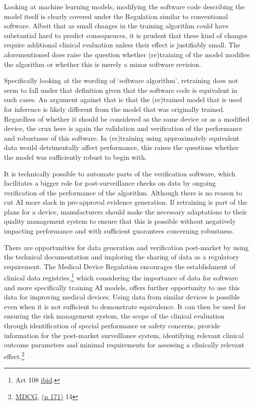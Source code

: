 \documentclass[
]{scrartcl}
\begin{document}
Looking at machine learning models, modifying the software code describing the model itself is clearly covered under the Regulation similar to conventional software. Albeit that as small changes in the training algorithm could have substantial hard to predict consequences, it is prudent that these kind of changes require additional clinical evaluation unless their effect is justifiably small. The aforementioned does raise the question whether (re)training of the model modifies the algorithm or whether this is merely a minor software revision.

Specifically looking at the wording of `software algorithm', retraining does not seem to fall under that definition given that the software code is equivalent in such cases. An argument against that is that the (re)trained model that is used for inference is likely different from the model that was originally trained. Regardless of whether it should be considered as the same device or as a modified device, the crux here is again the validation and verification of the performance and robustness of this software. In (re)training using approximately equivalent data would detrimentally affect performance, this raises the questions whether the model was sufficiently robust to begin with.

It is technically possible to automate parts of the verification software, which facilitates a bigger role for post-surveillance checks on data by ongoing verification of the performance of the algorithm. Although there is no reason to cut AI more slack in pre-approval evidence generation. If retraining is part of the plans for a device, manufacturers should make the necessary adaptations to their quality management system to ensure that this is possible without negatively impacting performance and with sufficient guarantees concerning robustness.

There are opportunities for data generation and verification post-market by using the technical documentation and imploring the sharing of data as a regulatory requirement. The Medical Device Regulation encourages the establishment of clinical data registries,\footnote{Art 108 \protect\hyperlink{ref-REGULATIONEU2017a}{ibid}.} which considering the importance of data for software and more specifically training AI models, offers further opportunity to use this data for improving medical devices. Using data from similar devices is possible even when it is not sufficient to demonstrate equivalence. It can then be used for ensuring the risk management system, the scope of the clinical evaluation through identification of special performance or safety concerns, provide information for the post-market surveillance system, identifying relevant clinical outcome parameters and minimal requirements for assessing a clinically relevant effect.\footnote{\protect\hyperlink{ref-mdcgClinicalEvaluationEquivalence2020}{MDCG}, \protect\hyperlink{ref-mdcgClinicalEvaluationEquivalence2020}{(n 171)} 14}
\end{document}
